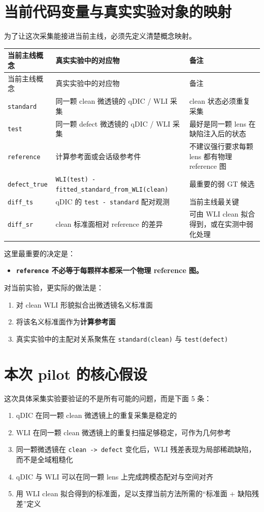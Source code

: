 \documentclass[UTF8,a4paper,11pt]{ctexart}
\newcommand{\Code}[1]{\texttt{#1}}
\newcommand{\Strong}[1]{\textbf{#1}}
\begin{document}
\section{当前代码变量与真实实验对象的映射}

为了让这次采集能接进当前主线，必须先定义清楚概念映射。

\begin{longtable}{p{} p{} p{}}
\toprule
当前主线概念 & 真实实验中的对应物 & 备注 \\
\midrule
\endfirsthead
\toprule
当前主线概念 & 真实实验中的对应物 & 备注 \\
\midrule
\endhead
\Code{standard} & 同一颗 clean 微透镜的 qDIC / WLI 采集 & clean 状态必须重复采集 \\
\Code{test} & 同一颗 defect 微透镜的 qDIC / WLI 采集 & 最好是同一颗 lens 在缺陷注入后的状态 \\
\Code{reference} & 计算参考面或会话级参考件 & 不建议强行要求每颗 lens 都有物理 reference 图 \\
\Code{defect\_true} & \Code{WLI(test) - fitted\_standard\_from\_WLI(clean)} & 最重要的弱 GT 候选 \\
\Code{diff\_ts} & qDIC 的 \Code{test - standard} 配对观测 & 当前主线最关键 \\
\Code{diff\_sr} & clean 标准面相对 reference 的差异 & 可由 WLI clean 拟合得到，或在实测中弱化处理 \\
\bottomrule
\end{longtable}

这里最重要的决定是：
\begin{itemize}
  \item \Strong{\Code{reference} 不必等于每颗样本都采一个物理 reference 图。}
\end{itemize}

对当前实验，更实际的做法是：
\begin{enumerate}
  \item 对 clean WLI 形貌拟合出微透镜名义标准面
  \item 将该名义标准面作为\Strong{计算参考面}
  \item 真实实验中的主配对关系聚焦在 \Code{standard(clean)} 与 \Code{test(defect)}
\end{enumerate}

\section{本次 pilot 的核心假设}

这次具体采集实验要验证的不是所有可能的问题，而是下面 5 条：
\begin{enumerate}
  \item qDIC 在同一颗 clean 微透镜上的重复采集是稳定的
  \item WLI 在同一颗 clean 微透镜上的重复扫描足够稳定，可作为几何参考
  \item 同一颗微透镜在 \Code{clean -> defect} 变化后，WLI 残差表现为局部稀疏缺陷，而不是全域粗糙化
  \item qDIC 与 WLI 可以在同一颗 lens 上完成跨模态配对与空间对齐
  \item 用 WLI clean 拟合得到的标准面，足以支撑当前方法所需的“标准面 + 缺陷残差”定义
\end{enumerate}
\end{document}
